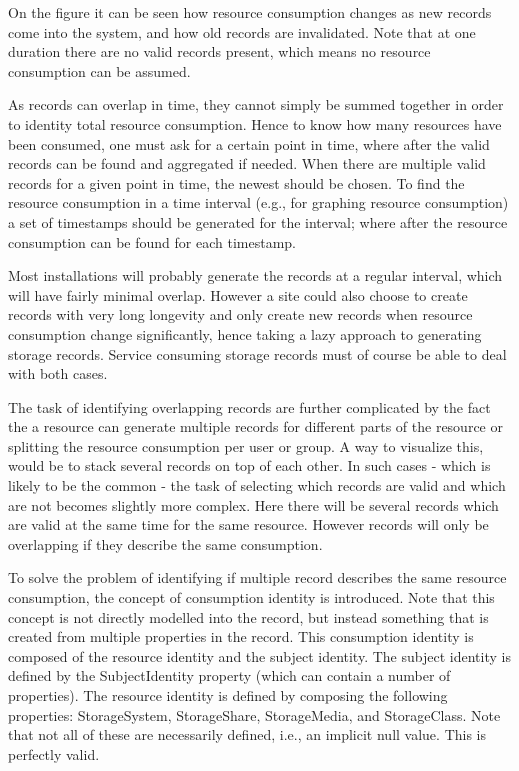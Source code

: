 On the figure it can be seen how resource consumption changes as new records
come into the system, and how old records are invalidated. Note that at one
duration there are no valid records present, which means no resource
consumption can be assumed.

As records can overlap in time, they cannot simply be summed together in order
to identity total resource consumption. Hence to know how many resources have
been consumed, one must ask for a certain point in time, where after the valid
records can be found and aggregated if needed. When there are multiple valid
records for a given point in time, the newest should be chosen. To find the
resource consumption in a time interval (e.g., for graphing resource
consumption) a set of timestamps should be generated for the interval; where
after the resource consumption can be found for each timestamp.

Most installations will probably generate the records at a regular interval,
which will have fairly minimal overlap. However a site could also choose to
create records with very long longevity and only create new records when
resource consumption change significantly, hence taking a lazy approach to
generating storage records. Service consuming storage records must of course be
able to deal with both cases.

The task of identifying overlapping records are further complicated by the fact
the a resource can generate multiple records for different parts of the
resource or splitting the resource consumption per user or group. A way to
visualize this, would be to stack several records on top of each other. In such
cases - which is likely to be the common - the task of selecting which records
are valid and which are not becomes slightly more complex. Here there will be
several records which are valid at the same time for the same resource. However
records will only be overlapping if they describe the same consumption.

To solve the problem of identifying if multiple record describes the same
resource consumption, the concept of consumption identity is introduced. Note
that this concept is not directly modelled into the record, but instead
something that is created from multiple properties in the record. This
consumption identity is composed of the resource identity and the subject
identity. The subject identity is defined by the SubjectIdentity property
(which can contain a number of properties). The resource identity is defined by
composing the following properties: StorageSystem, StorageShare, StorageMedia,
and StorageClass. Note that not all of these are necessarily defined, i.e., an
implicit null value. This is perfectly valid.

